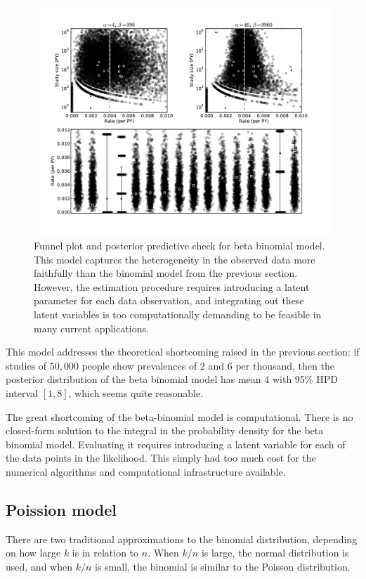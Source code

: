 \begin{figure}[ht]
\begin{center}
\includegraphics[width=\textwidth]{beta-binomial-funnel.pdf}
\end{center}
\caption{Funnel plot and posterior predictive check for beta binomial
  model. This model captures the heterogeneity in the observed data
  more faithfully than the binomial model from the previous section.
  However, the estimation procedure requires introducing a latent
  parameter for each data observation, and integrating out these
  latent variables is too computationally demanding to be feasible in
  many current applications.}
\label{rate-model-beta-binomial-funnel}
\end{figure}

This model addresses the theoretical shortcoming raised in the
previous section: if studies of $50,000$ people show prevalences of
$2$ and $6$ per thousand, then the posterior distribution of the beta
binomial model has mean $4$ with 95\% HPD interval $[1,8]$, which
seems quite reasonable.

The great shortcoming of the beta-binomial model is computational.
There is no closed-form solution to the integral in the probability
density for the beta binomial model.  Evaluating it requires
introducing a latent variable for each of the data points in the
likelihood.  This simply had too much cost for the numerical
algorithms and computational infrastructure available.

\subsection{Poission model}
There are two traditional approximations to the binomial distribution,
depending on how large $k$ is in relation to $n$.  When $k/n$ is
large, the normal distribution is used, and when $k/n$ is small, the
binomial is similar to the Poisson distribution.

